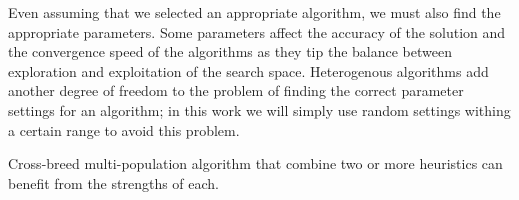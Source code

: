 \documentclass[runningheads]{llncs}
\begin{document}
Even assuming that we selected an appropriate algorithm, we must also find the
appropriate parameters.  Some parameters affect the accuracy of the solution and
the convergence speed of the algorithms as they tip the balance between exploration
and exploitation of the search space. Heterogenous algorithms add
another degree of freedom to the problem of finding the correct
parameter settings for an algorithm; in this work we will simply use
random settings withing a certain range to avoid this problem.


Cross-breed multi-population algorithm that combine two or more
heuristics can benefit from the strengths of each. %
\end{document}
